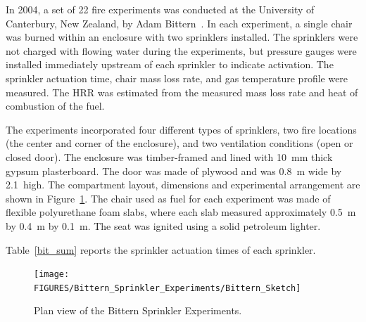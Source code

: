 In 2004, a set of 22 fire experiments was conducted at the University of Canterbury, New Zealand, by Adam Bittern~\cite{Bittern:Thesis,Wade:FT2007}. In each experiment, a single chair was burned within an enclosure with two sprinklers installed. The sprinklers were not charged with flowing water during the experiments, but pressure gauges were installed immediately upstream of each sprinkler to indicate activation. The sprinkler actuation time, chair mass loss rate, and gas temperature profile were measured. The HRR was estimated from the measured mass loss rate and heat of combustion of the fuel.

The experiments incorporated four different types of sprinklers, two fire locations (the center and corner of the enclosure), and two ventilation conditions (open or closed door). The enclosure was timber-framed and lined with 10~mm thick gypsum plasterboard. The door was made of plywood and was 0.8~m wide by 2.1~high. The compartment layout, dimensions and experimental arrangement are shown in Figure~\ref{bit_plan}. The chair used as fuel for each experiment was made of flexible polyurethane foam slabs, where each slab measured approximately 0.5~m by 0.4~m by 0.1~m. The seat was ignited using a solid petroleum lighter.

Table~\ref{bit_sum} reports the sprinkler actuation times of each sprinkler.

\begin{figure}[h]
\centering
\texttt{[image: FIGURES/Bittern\_Sprinkler\_Experiments/Bittern\_Sketch]}
\caption[Plan view of the Bittern Sprinkler Experiments]{Plan view of the Bittern Sprinkler Experiments.}
\label{bit_plan}
\end{figure}


